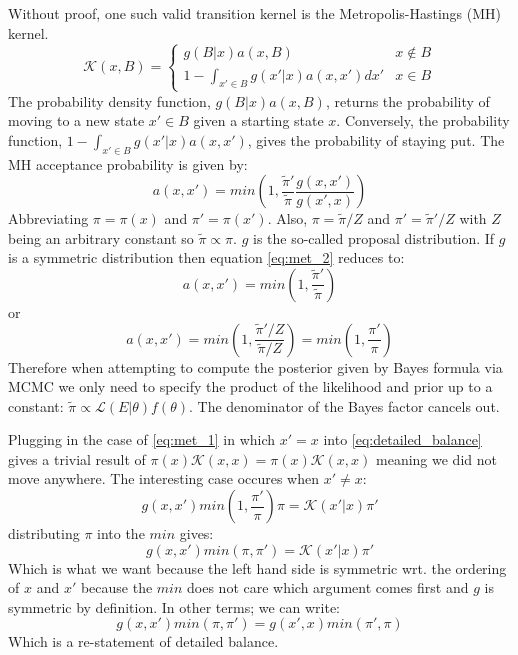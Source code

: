 \documentclass[10pt,a4paper]{report}
\begin{document}
Without proof, one such valid transition kernel is the Metropolis-Hastings (MH) kernel.
\begin{equation}
    \mathcal K(x, B)=
    \begin{cases}
        g(B|x)a(x,B) & x \not \in B \\
        1 - \int_{x' \in B} g(x'|x)a(x,x')dx' & x \in B
    \end{cases}
\label{eq:met_1}
\end{equation}
The probability density function, $g(B|x)a(x,B) $, returns the probability of moving to a new state $x'\in B$ given a starting state $x$. Conversely,
the probability function, $1 - \int_{x' \in B} g(x'| x)a(x,x')$, gives the probability of staying put.
The MH acceptance probability is given by:
\begin{equation}
a(x,x') = min \left( 1, \frac{ \tilde \pi'}{\tilde{\pi}} \frac{g(x,x')}{g(x',x)} \right)
\label{eq:met_2}
\end{equation}
Abbreviating $\pi = \pi(x)$ and $\pi' = \pi(x')$. Also, $\pi = \tilde \pi / Z$ and  $\pi' = \tilde \pi' / Z$ with $Z$ being an arbitrary constant so $\tilde \pi \propto \pi$. $g$ is the so-called proposal distribution.  If $g$ is a symmetric distribution then equation \ref{eq:met_2} reduces to:
\begin{equation}
a(x,x') = min \left( 1, \frac{ \tilde \pi'}{\tilde{\pi}} \right)
\end{equation}
or
\begin{equation}
a(x,x') = min \left( 1, \frac{ \tilde \pi' / Z}{\tilde \pi/ Z} \right) =  min \left( 1, \frac{ \pi' }{\pi} \right) 
\end{equation}
Therefore when attempting to compute the posterior given by Bayes formula via MCMC we only need to specify the product of the likelihood and prior up to a constant:  $\tilde \pi \propto \mathcal L(E|\theta) f(\theta) $.  The denominator of the Bayes factor cancels out.

Plugging in the case of \ref{eq:met_1} in which $x' = x$ into \ref{eq:detailed_balance} gives a trivial result of $\pi(x)\mathcal K(x, x) = \pi(x) \mathcal K(x, x)$ meaning we did not move anywhere.  The interesting case occures when $x' \ne x$:
\begin{equation}
g(x,x') min \left( 1, \frac{ \pi' }{\pi} \right) \pi = \mathcal K(x'|x)\pi'
\end{equation}
distributing $\pi$ into the $min$ gives:
\begin{equation}
g(x,x') min \left( \pi, \pi'  \right) = \mathcal K(x'|x)\pi'
\end{equation}
Which is what we want because the left hand side is symmetric wrt. the ordering of $x$ and $x'$ because the $min$ does not care which argument comes first and $g$ is symmetric by definition.  In other terms; we can write:
\begin{equation}
g(x,x') min \left( \pi, \pi'  \right) = g(x',x) min \left( \pi', \pi  \right)
\end{equation}
Which is a re-statement of detailed balance.
\end{document}

